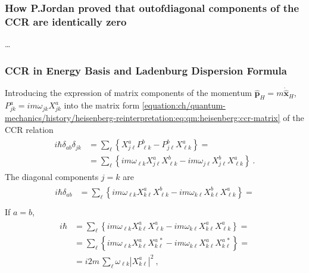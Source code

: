 \documentclass[letterpaper,10pt,english]{jupyterBook}
\begin{document}
\subsubsection*{How P.Jordan proved that out\sphinxhyphen{}of\sphinxhyphen{}diagonal components of the CCR are identically zero}

\sphinxAtStartPar
…


\subsubsection{CCR in Energy Basis and Ladenburg Dispersion Formula}
\label{\detokenize{ch/quantum-mechanics/history/heisenberg-reinterpretation:ccr-in-energy-basis-and-ladenburg-dispersion-formula}}\label{\detokenize{ch/quantum-mechanics/history/heisenberg-reinterpretation:quantum-mechanics-history-heisenberg-reinterpretation-ccr-ladenburg}}
\sphinxAtStartPar
Introducing the expression of matrix components of the momentum \(\hat{\mathbf{p}}_H = m \dot{\hat{\mathbf{x}}}_H\), \(P^a_{jk} = i m \omega_{jk} X^{a}_{jk}\) into the matrix form \eqref{equation:ch/quantum-mechanics/history/heisenberg-reinterpretation:eq:qm:heisenberg:ccr-matrix} of the CCR relation
\begin{equation*}
\begin{split}\begin{aligned}
  i \hbar \delta_{ab} \delta_{jk} 
  & = \sum_{\ell} \left\{ X^{a}_{j \ell} P^{b}_{\ell k} - P^{b}_{j \ell} X^{a}_{\ell k} \right\} = \\
  & = \sum_{\ell} \left\{ i m \omega_{\ell k} X^{a}_{j \ell} X^{b}_{\ell k} - i m \omega_{j \ell} X^{b}_{j \ell} X^{a}_{\ell k} \right\} \ .
\end{aligned}\end{split}
\end{equation*}
\sphinxAtStartPar
The diagonal components \(j = k\) are
\begin{equation*}
\begin{split}\begin{aligned}
  i \hbar \delta_{ab} 
  & = \sum_{\ell} \left\{ i m \omega_{\ell k} X^{a}_{k \ell} X^{b}_{\ell k} - i m \omega_{k \ell} X^{b}_{k \ell} X^{a}_{\ell k} \right\} = \\
\end{aligned}\end{split}
\end{equation*}
\sphinxAtStartPar
If \(a = b\),
\begin{equation*}
\begin{split}\begin{aligned}
  i \hbar 
  & = \sum_{\ell} \left\{ i m \omega_{\ell k} X^{a}_{k \ell} X^{a}_{\ell k} - i m \omega_{k \ell} X^{a}_{k \ell} X^{a}_{\ell k} \right\} = \\
  & = \sum_{\ell} \left\{ i m \omega_{\ell k} X^{a}_{k \ell} X^{a \, *}_{k \ell} - i m \omega_{k \ell} X^{a}_{k \ell} X^{a \, *}_{k \ell} \right\} = \\
  & = i 2 m \, \sum_{\ell} \omega_{\ell k} \left| X^{a}_{k \ell} \right|^2  \ ,
\end{aligned}\end{split}
\end{equation*}
\end{document}
